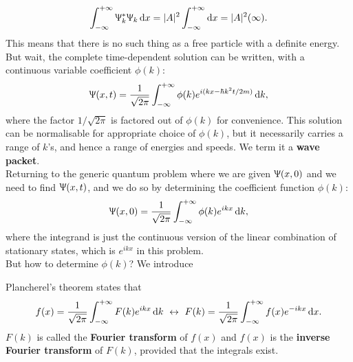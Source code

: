 \begin{equation}
\intinf\ups_k^*\ups_k\dx=|A|^2\intinf\dx=|A|^2(\inf).
\end{equation}
This means that there is no such thing as a free particle with a definite energy. \\
But wait, the complete time-dependent solution can be written, with a continuous variable coefficient $\phi(k)$:
\begin{equation}
\ups(x,t)=\frac{1}{\sqrt{2\pi}}\intinf\phi(k)e^{i(kx-\hbar k^2t/2m)}\dif k, 
\end{equation}
where the factor $1/\sqrt{2\pi}$ is factored out of $\phi(k)$ for convenience. 
This solution can be normalisable for appropriate choice of $\phi(k)$, 
but it necessarily carries a range of $k$'s, and hence a range of energies and speeds. 
We term it a \textbf{wave packet}. \\
Returning to the generic quantum problem where we are given $\Uppsi(x,0)$ and we need to find $\Uppsi(x,t)$, and we do so by determining the coefficient function $\phi(k)$:
\begin{equation}
\ups(x,0)=\frac{1}{\sqrt{2\pi}}\intinf\phi(k)e^{ikx}\dif k,
\end{equation}
where the integrand is just the continuous version of the linear combination of stationary states, which is $e^{ikx}$ in this problem. \\
But how to determine $\phi(k)$? We introduce 
\begin{thrm}
\label{plan_thrm}
Plancherel's theorem states that
\begin{equation}
f(x)=\frac{1}{\sqrt{2\pi}}\intinf F(k)e^{ikx}\dif k\ \leftrightarrow\ F(k)=\frac{1}{\sqrt{2\pi}}\intinf f(x)e^{-ikx}\dx.
\end{equation}
$F(k)$ is called the \textbf{Fourier transform} of $f(x)$ and $f(x)$ is the \textbf{inverse Fourier transform} of $F(k)$, 
provided that the integrals exist. 
\end{thrm}
